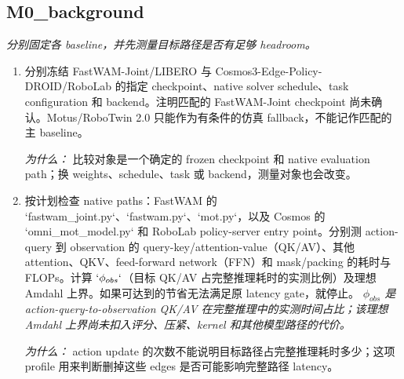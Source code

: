 \documentclass[10pt,a4paper]{article}
\begin{document}
\subsection*{M0\_background}
\emph{分别固定各 baseline，并先测量目标路径是否有足够 headroom。}
\begin{enumerate}[leftmargin=*,start=1]
  \item 分别冻结 FastWAM-Joint/LIBERO 与 Cosmos3-Edge-Policy-DROID/RoboLab 的指定 checkpoint、native solver schedule、task configuration 和 backend。注明匹配的 FastWAM-Joint checkpoint 尚未确认。Motus/RoboTwin 2.0 只能作为有条件的仿真 fallback，不能记作匹配的主 baseline。
\par\emph{为什么：} 比较对象是一个确定的 frozen checkpoint 和 native evaluation path；换 weights、schedule、task 或 backend，测量对象也会改变。
  \item 按计划检查 native paths：FastWAM 的 `fastwam\_joint.py`、`fastwam.py`、`mot.py`，以及 Cosmos 的 `omni\_mot\_model.py` 和 RoboLab policy-server entry point。分别测 action-query 到 observation 的 query-key/attention-value（QK/AV）、其他 attention、QKV、feed-forward network（FFN）和 mask/packing 的耗时与 FLOPs。计算 \(`\phi _{obs}`\)（目标 QK/AV 占完整推理耗时的实测比例）及理想 Amdahl 上界。如果可达到的节省无法满足原 latency gate，就停止。
\noindent\emph{\(\phi _{obs}\) 是 action-query-to-observation QK/AV 在完整推理中的实测时间占比；该理想 Amdahl 上界尚未扣入评分、压紧、kernel 和其他模型路径的代价。}
\par{}
\par\emph{为什么：} action update 的次数不能说明目标路径占完整推理耗时多少；这项 profile 用来判断删掉这些 edges 是否可能影响完整路径 latency。
\end{enumerate}
\end{document}

